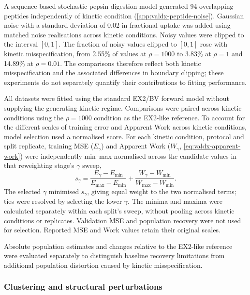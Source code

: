 A sequence-based stochastic pepsin digestion model generated 94 overlapping peptides independently of kinetic condition (\cref{app:valdx-peptide-noise}). Gaussian noise with a standard deviation of 0.02 in fractional uptake was added using matched noise realisations across kinetic conditions. Noisy values were clipped to the interval $[0,1]$. The fraction of noisy values clipped to $[0,1]$ rose with kinetic misspecification, from 2.55\% of values at $\rho=1000$ to 3.83\% at $\rho=1$ and 14.89\% at $\rho=0.01$. The comparisons therefore reflect both kinetic misspecification and the associated differences in boundary clipping; these experiments do not separately quantify their contributions to fitting performance.

All datasets were fitted using the standard EX2/BV forward model without supplying the generating kinetic regime. Comparisons were paired across kinetic conditions using the $\rho=1000$ condition as the EX2-like reference. To account for the different scales of training error and Apparent Work across kinetic conditions, model selection used a normalised score. For each kinetic condition, protocol and split replicate, training MSE ($E_\gamma$) and Apparent Work ($W_\gamma$, \cref{eq:valdx-apparent-work}) were independently min--max-normalised across the candidate values in that reweighting stage's $\gamma$ sweep,
\begin{equation}
    s_\gamma = \frac{E_\gamma-E_{\min}}{E_{\max}-E_{\min}}
             + \frac{W_\gamma-W_{\min}}{W_{\max}-W_{\min}}.
    \label{eq:valdx-kinetic-selection-score}
\end{equation}
The selected $\gamma$ minimised $s_\gamma$, giving equal weight to the two normalised terms; ties were resolved by selecting the lower $\gamma$. The minima and maxima were calculated separately within each split's sweep, without pooling across kinetic conditions or replicates. Validation MSE and population recovery were not used for selection. Reported MSE and Work values retain their original scales.

Absolute population estimates and changes relative to the EX2-like reference were evaluated separately to distinguish baseline recovery limitations from additional population distortion caused by kinetic misspecification.

\subsubsection{Clustering and structural perturbations}
\label{sec:valdx-decoys}

